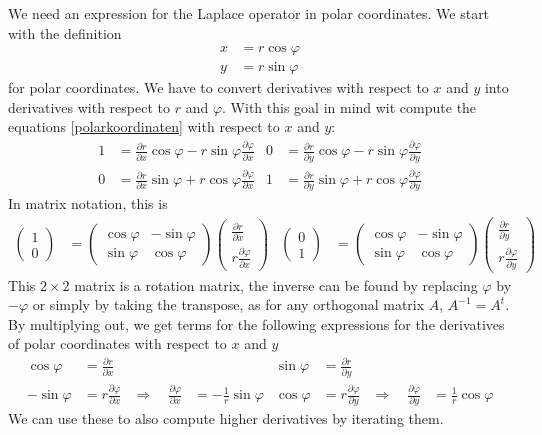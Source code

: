 We need an expression for the Laplace operator in polar coordinates.
We start with the definition
\begin{align}
x&=r\cos\varphi\\
y&=r\sin\varphi
\label{polarkoordinaten}
\end{align}
for polar coordinates.
We have to convert derivatives with respect to $x$ and $y$
into derivatives with respect to $r$ and $\varphi$.
With this goal in mind wit compute the equations
\eqref{polarkoordinaten} with respect to $x$ and $y$:
\begin{align*}
1&=
\frac{\partial r}{\partial x}\cos\varphi
-r\sin\varphi \frac{\partial\varphi}{\partial x}
&
0&=
\frac{\partial r}{\partial y}\cos\varphi
-r\sin\varphi \frac{\partial\varphi}{\partial y}
\\
0&=
\frac{\partial r}{\partial x}\sin\varphi
+r\cos\varphi \frac{\partial\varphi}{\partial x}
&
1&=
\frac{\partial r}{\partial y}\sin\varphi
+r\cos\varphi \frac{\partial\varphi}{\partial y}
\end{align*}
In matrix notation, this is
\begin{align*}
\begin{pmatrix}1\\0\end{pmatrix}
&=
\begin{pmatrix}
\cos\varphi&-\sin\varphi\\
\sin\varphi&\cos\varphi
\end{pmatrix}
\begin{pmatrix}
\frac{\partial r}{\partial x}\\
r\frac{\partial \varphi}{\partial x}
\end{pmatrix}
&
\begin{pmatrix}0\\1\end{pmatrix}
&=
\begin{pmatrix}
\cos\varphi&-\sin\varphi\\
\sin\varphi&\cos\varphi
\end{pmatrix}
\begin{pmatrix}
\frac{\partial r}{\partial y}\\
r\frac{\partial \varphi}{\partial y}
\end{pmatrix}
\end{align*}
This 
$2\times2$ matrix is a rotation matrix, the inverse can be found
by replacing $\varphi$ by $-\varphi$ or simply by taking the
transpose, as for any orthogonal matrix $A$, $A^{-1}=A^t$.
By multiplying out, we get terms for the following expressions for
the derivatives of polar coordinates with respect to $x$ and $y$
\begin{align*}
\cos\varphi
&=\frac{\partial r}{\partial x}
&&
&
\sin\varphi
&=
\frac{\partial r}{\partial y}
&&
\\
-\sin\varphi
&=r\frac{\partial \varphi}{\partial x}
&\Rightarrow\quad
\frac{\partial\varphi}{\partial x}&=-\frac1r\sin\varphi
&
\cos\varphi
&=
r\frac{\partial\varphi}{\partial y}
&\Rightarrow\quad
\frac{\partial\varphi}{\partial y}&=\frac1r\cos\varphi
\end{align*}
We can use these to also compute higher derivatives by
iterating them.

